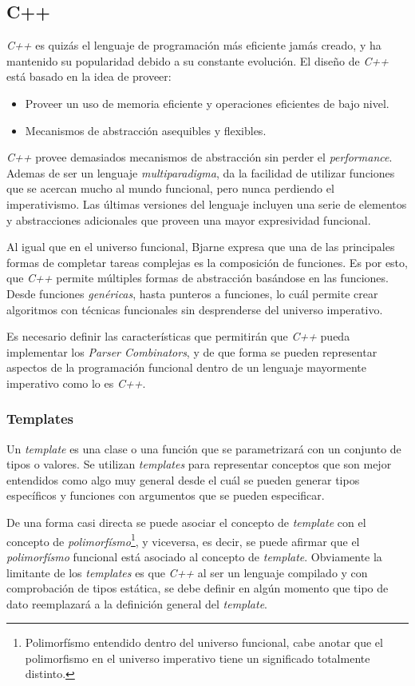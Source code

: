 	\subsection{C++}
	\emph{C++} es quizás el lenguaje de programación más eficiente jamás creado, y ha mantenido su popularidad debido a su constante evolución. El diseño de \emph{C++} está basado en la idea de proveer:	
	\begin{itemize}
		\item Proveer un uso de memoria eficiente y operaciones eficientes de bajo nivel.
		\item Mecanismos de abstracción asequibles y flexibles. \cite{Bjarne2013}
	\end{itemize}
	
	\emph{C++} provee demasiados mecanismos de abstracción sin perder el \emph{performance}. Ademas de ser un lenguaje \emph{multiparadigma}, da la facilidad de utilizar funciones que se acercan mucho al mundo funcional, pero nunca perdiendo el imperativismo. Las últimas versiones del lenguaje incluyen una serie de elementos y abstracciones adicionales que proveen una mayor expresividad funcional.
	
	Al igual que en el universo funcional, Bjarne expresa que una de las principales formas de completar tareas complejas es la composición de funciones. Es por esto, que \emph{C++} permite múltiples formas de abstracción basándose en las funciones. Desde funciones \emph{genéricas}, hasta punteros a funciones, lo cuál permite crear algoritmos con técnicas funcionales sin desprenderse del universo imperativo. 
	
	Es necesario definir las características que permitirán que \emph{C++} pueda implementar los \emph{Parser Combinators}, y de que forma se pueden representar aspectos de la programación funcional dentro de un lenguaje mayormente imperativo como lo es \emph{C++}.
	
	\subsubsection{Templates}
		Un \emph{template} es una clase o una función que se parametrizará con un conjunto de tipos o valores. Se utilizan \emph{templates} para representar conceptos que son mejor entendidos como algo muy general desde el cuál se pueden generar tipos específicos y funciones con argumentos que se pueden especificar. \cite{Bjarne2013}
		
		De una forma casi directa se puede asociar el concepto de \emph{template} con el concepto de \emph{polimorfísmo}\footnote{Polimorfísmo entendido dentro del universo funcional, cabe anotar que el polimorfismo en el universo imperativo tiene un significado totalmente distinto.}, y viceversa, es decir, se puede afirmar que el \emph{polimorfísmo} funcional está asociado al concepto de \emph{template}. Obviamente la limitante de los \emph{templates} es que \emph{C++} al ser un lenguaje compilado y con comprobación de tipos estática, se debe definir en algún momento que tipo de dato reemplazará a la definición general del \emph{template}.
		
